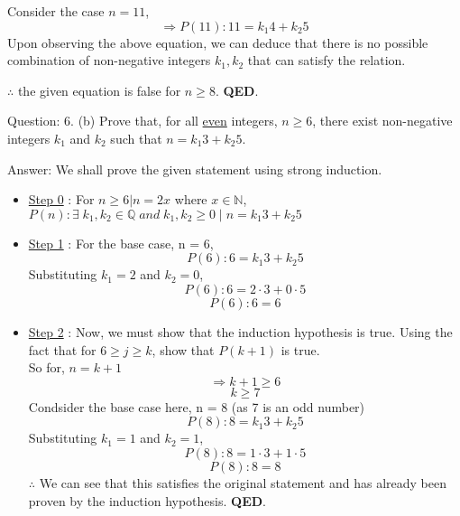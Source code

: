\documentclass[a4paper]{article}
\begin{document}
\begin{qalist}
\begin{itemize}
				Consider the case $n=11$, 
				\[\Rightarrow P(11) : 11 = {k}_{1}4 + {k}_{2}5\]
				Upon observing the above equation, we can deduce that there is no possible combination of non-negative integers ${k}_{1}, {k}_{2}$ that can satisfy the relation. 
				
				$\therefore$ the given equation is false for $n \geq 8$. \textbf{QED}.
			\end{itemize}
		
		\item[Question: 6. (b)] \setcounter{equation}{0} Prove that, for all \underline{even} integers, $n \geq 6$, there exist non-negative integers ${k}_{1}$ and ${k}_{2}$ such that $n = {k}_{1} 3 + {k}_{2} 5$. 
		\item[Answer:]  We shall prove the given statement using strong induction.
			
			\begin{itemize}
				\item \underline{Step 0} : For $n \geq 6 | n = 2x$ where $x \in \mathbb{N}$, $P(n): \exists \; {k}_{1}, {k}_{2} \in \mathbb{Q} \;and\; {k}_{1}, {k}_{2} \geq 0 \; | \; n = {k}_{1} 3 + {k}_{2} 5$ 
				\item \underline{Step 1} : For the base case, n = 6, 
					\[ P(6) : 6 = {k}_{1}3 + {k}_{2}5 \]
					Substituting ${k}_{1} = 2$ and ${k}_{2} = 0$, 
					\[ P(6) : 6 = 2\cdot3 + 0\cdot5 \]
					\[ P(6) : 6 = 6 \]
				\item \underline{Step 2} : Now, we must show that the induction hypothesis is true. Using the fact that for $6 \geq j \geq k$, show that $P(k+1)$ is true.
					\\So for, $n = k + 1$ 
					\[\Rightarrow k + 1 \geq 6\]
					\[k \geq 7\]
					Condsider the base case here, n = 8 (as 7 is an odd number)
					\[P(8) : 8 ={k}_{1}3 + {k}_{2}5 \]
					Substituting ${k}_{1} = 1$ and ${k}_{2} = 1$, 
					\[ P(8) : 8 = 1\cdot3 + 1\cdot5 \]
					\[ P(8) : 8 = 8 \]
					$\therefore$ We can see that this satisfies the original statement and has already been proven by the induction hypothesis. \textbf{QED}.
			\end{itemize}
	\end{qalist}
\end{document}
